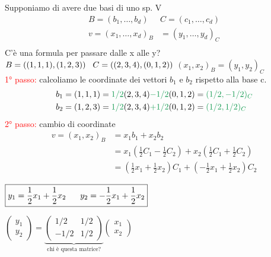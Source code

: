 \textsf{\small Supponiamo di avere due basi di uno sp. V}\\
\begin{align*}
	B = (b_1, \dots, b_d) & C = (c_1, \dots, c_d) \\
	v = (x_1, \dots, x_d)_B & = (y_1, \dots, y_d)_C \\
\end{align*}\vskip -1.0cm
\textsf{\small C'è una formula per passare dalle x alle y?}\\
\(
B = ((1,1,1),(1,2,3)) \hspace{0.3cm} C = ((2,3,4),(0,1,2))
\)
\centering $(x_1, x_2)_B = (y_1, y_2)_C $\\
\textcolor{red}{1° passo:} \textsf{\small calcoliamo le coordinate dei vettori $b_1$ e $b_2$ rispetto alla base c.}
\begin{align*}
	b_1 = (1,1,1) &= \textcolor{ForestGreen}{1/2}(2,3,4) \textcolor{ForestGreen}{-1/2}(0,1,2) = \textcolor{ForestGreen}{(1/2, -1/2)_C}\\
	b_2 = (1,2,3) &= \textcolor{ForestGreen}{1/2}(2,3,4) \textcolor{ForestGreen}{+1/2}(0,1,2) = \textcolor{ForestGreen}{(1/2, 1/2)_C}
\end{align*}
\newpage
\flushleft\textcolor{red}{2° passo:} \textsf{\small cambio di coordinate}\\\vskip-1.0cm
\begin{align*}
	v = (x_1, x_2)_B &= x_1 b_1 + x_2 b_2 \\
	&= x_1(\frac{1}{2}C_1 - \frac{1}{2}C_2) + x_2(\frac{1}{2}C_1 + \frac{1}{2}C_2) \\
	&= (\frac{1}{2}x_1 + \frac{1}{2}x_2)C_1 + (-\frac{1}{2}x_1 + \frac{1}{2}x_2)C_2
\end{align*}

\centering\textcolor{red}{$\boxed{\normalcolor y_1 = \frac{1}{2}x_1 + \frac{1}{2}x_2 \hspace{0.6cm} y_2 = -\frac{1}{2}x_1 + \frac{1}{2}x_2}$}

\flushleft
\(
\begin{pmatrix}
	y_1 \\
	y_2
\end{pmatrix}
=
\underbrace{
\begin{pmatrix}
	1/2 & 1/2 \\
	-1/2 & 1/2 
\end{pmatrix}
} _{\text{chi è questa matrice?}}
\begin{pmatrix}
	x_1 \\
	x_2
\end{pmatrix}
\)

